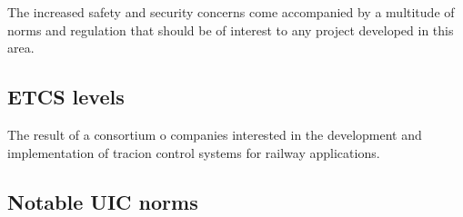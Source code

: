 The increased safety and security concerns come accompanied by a multitude of norms and regulation that should be of interest to any project developed in this area.

\subsection{ETCS levels}
The result of a consortium o companies interested in the development and implementation of tracion control systems for railway applications.
\subsection{Notable UIC norms}

